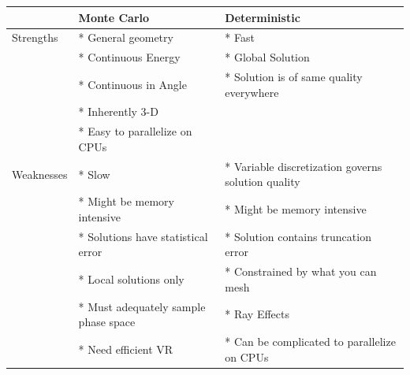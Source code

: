 \documentclass[12pt]{article}
\begin{document}
\begin{center}
\begin{tabu}{| l | X | X |}
  \hline
  & Monte Carlo         & Deterministic \\\hline
    Strengths & * General geometry    & * Fast \\
              & * Continuous Energy   & * Global Solution\\
              & * Continuous in Angle & * Solution is of same quality everywhere\\
              & * Inherently 3-D      & \\
              & * Easy to parallelize on CPUs & \\\hline
    Weaknesses & * Slow & * Variable discretization governs solution quality \\
               & * Might be memory intensive & * Might be memory intensive \\
               & * Solutions have statistical error & * Solution contains truncation error\\
               & * Local solutions only & * Constrained by what you can mesh \\
               & * Must adequately sample phase space & * Ray Effects \\
               & * Need efficient VR & * Can be complicated to parallelize on CPUs \\\hline
  \end{tabu}
\end{center}
\end{document}
